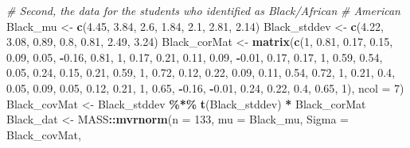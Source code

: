 \documentclass[
  11pt,
]{book}
\newenvironment{Shaded}{\begin{snugshade}}{\end{snugshade}}
\newcommand{\AttributeTok}[1]{\textcolor[rgb]{0.27,0.27,0.27}{#1}}
\newcommand{\CommentTok}[1]{\textcolor[rgb]{0.37,0.37,0.37}{\textit{#1}}}
\newcommand{\DecValTok}[1]{\textcolor[rgb]{0.06,0.06,0.06}{#1}}
\newcommand{\FloatTok}[1]{\textcolor[rgb]{0.06,0.06,0.06}{#1}}
\newcommand{\FunctionTok}[1]{\textcolor[rgb]{0.27,0.27,0.27}{\textbf{#1}}}
\newcommand{\NormalTok}[1]{#1}
\newcommand{\OtherTok}[1]{\textcolor[rgb]{0.37,0.37,0.37}{#1}}
\newcommand{\SpecialCharTok}[1]{\textcolor[rgb]{0.43,0.43,0.43}{\textbf{#1}}}
\begin{document}
\begin{Shaded}
\begin{Highlighting}[]
\CommentTok{\# Second, the data for the students who identified as Black/African}
\CommentTok{\# American}
\NormalTok{Black\_mu }\OtherTok{\textless{}{-}} \FunctionTok{c}\NormalTok{(}\FloatTok{4.45}\NormalTok{, }\FloatTok{3.84}\NormalTok{, }\FloatTok{2.6}\NormalTok{, }\FloatTok{1.84}\NormalTok{, }\FloatTok{2.1}\NormalTok{, }\FloatTok{2.81}\NormalTok{, }\FloatTok{2.14}\NormalTok{)}
\NormalTok{Black\_stddev }\OtherTok{\textless{}{-}} \FunctionTok{c}\NormalTok{(}\FloatTok{4.22}\NormalTok{, }\FloatTok{3.08}\NormalTok{, }\FloatTok{0.89}\NormalTok{, }\FloatTok{0.8}\NormalTok{, }\FloatTok{0.81}\NormalTok{, }\FloatTok{2.49}\NormalTok{, }\FloatTok{3.24}\NormalTok{)}
\NormalTok{Black\_corMat }\OtherTok{\textless{}{-}} \FunctionTok{matrix}\NormalTok{(}\FunctionTok{c}\NormalTok{(}\DecValTok{1}\NormalTok{, }\FloatTok{0.81}\NormalTok{, }\FloatTok{0.17}\NormalTok{, }\FloatTok{0.15}\NormalTok{, }\FloatTok{0.09}\NormalTok{, }\FloatTok{0.05}\NormalTok{, }\SpecialCharTok{{-}}\FloatTok{0.16}\NormalTok{, }\FloatTok{0.81}\NormalTok{,}
    \DecValTok{1}\NormalTok{, }\FloatTok{0.17}\NormalTok{, }\FloatTok{0.21}\NormalTok{, }\FloatTok{0.11}\NormalTok{, }\FloatTok{0.09}\NormalTok{, }\SpecialCharTok{{-}}\FloatTok{0.01}\NormalTok{, }\FloatTok{0.17}\NormalTok{, }\FloatTok{0.17}\NormalTok{, }\DecValTok{1}\NormalTok{, }\FloatTok{0.59}\NormalTok{, }\FloatTok{0.54}\NormalTok{, }\FloatTok{0.05}\NormalTok{,}
    \FloatTok{0.24}\NormalTok{, }\FloatTok{0.15}\NormalTok{, }\FloatTok{0.21}\NormalTok{, }\FloatTok{0.59}\NormalTok{, }\DecValTok{1}\NormalTok{, }\FloatTok{0.72}\NormalTok{, }\FloatTok{0.12}\NormalTok{, }\FloatTok{0.22}\NormalTok{, }\FloatTok{0.09}\NormalTok{, }\FloatTok{0.11}\NormalTok{, }\FloatTok{0.54}\NormalTok{, }\FloatTok{0.72}\NormalTok{,}
    \DecValTok{1}\NormalTok{, }\FloatTok{0.21}\NormalTok{, }\FloatTok{0.4}\NormalTok{, }\FloatTok{0.05}\NormalTok{, }\FloatTok{0.09}\NormalTok{, }\FloatTok{0.05}\NormalTok{, }\FloatTok{0.12}\NormalTok{, }\FloatTok{0.21}\NormalTok{, }\DecValTok{1}\NormalTok{, }\FloatTok{0.65}\NormalTok{, }\SpecialCharTok{{-}}\FloatTok{0.16}\NormalTok{, }\SpecialCharTok{{-}}\FloatTok{0.01}\NormalTok{,}
    \FloatTok{0.24}\NormalTok{, }\FloatTok{0.22}\NormalTok{, }\FloatTok{0.4}\NormalTok{, }\FloatTok{0.65}\NormalTok{, }\DecValTok{1}\NormalTok{), }\AttributeTok{ncol =} \DecValTok{7}\NormalTok{)}
\NormalTok{Black\_covMat }\OtherTok{\textless{}{-}}\NormalTok{ Black\_stddev }\SpecialCharTok{\%*\%} \FunctionTok{t}\NormalTok{(Black\_stddev) }\SpecialCharTok{*}\NormalTok{ Black\_corMat}
\NormalTok{Black\_dat }\OtherTok{\textless{}{-}}\NormalTok{ MASS}\SpecialCharTok{::}\FunctionTok{mvrnorm}\NormalTok{(}\AttributeTok{n =} \DecValTok{133}\NormalTok{, }\AttributeTok{mu =}\NormalTok{ Black\_mu, }\AttributeTok{Sigma =}\NormalTok{ Black\_covMat,}

\end{Highlighting}
\end{Shaded}
\end{document}
